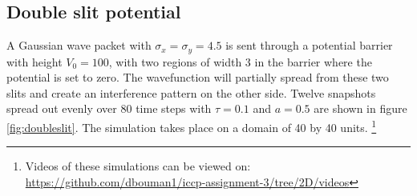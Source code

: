 \subsection*{Double slit potential}
A Gaussian wave packet with $\sigma_x = \sigma_y = 4.5$ is sent through a potential barrier with height $V_0 = 100$, with two regions of width 3 in the barrier where the potential is set to zero. The wavefunction will partially spread from these two slits and create an interference pattern on the other side. Twelve snapshots spread out evenly over 80 time steps with $\tau = 0.1$ and $a=0.5$ are shown in figure \ref{fig:doubleslit}. The simulation takes place on a domain of 40 by 40 units. \footnote{Videos of these simulations can be viewed on: \text{ }\url{https://github.com/dbouman1/iccp-assignment-3/tree/2D/videos}}

%
\def\arraystretch{0.6}%
\setlength\tabcolsep{0.5mm}
